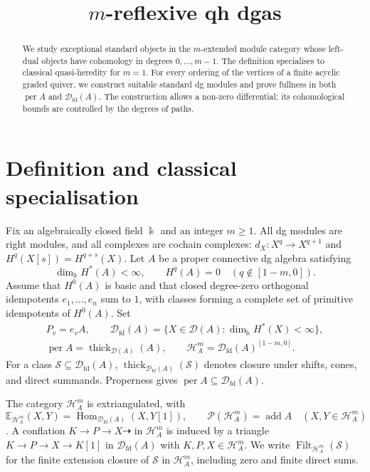 \documentclass[11pt,a4paper]{article}
\title{$m$-reflexive qh dgas}
\author{}
\date{}
\newcommand{\D}{\mathcal D}
\renewcommand{\H}{\mathcal H}
\DeclareMathOperator{\fd}{fd}
\DeclareMathOperator{\Hom}{Hom}
\DeclareMathOperator{\add}{add}
\DeclareMathOperator{\thick}{thick}
\DeclareMathOperator{\per}{per}
\DeclareMathOperator{\Filt}{Filt}
\theoremstyle{plain}
\theoremstyle{definition}
\numberwithin{equation}{section}
\begin{document}
\maketitle
\begin{abstract}
We study exceptional standard objects in the $m$-extended module category
whose left-dual objects have cohomology in degrees $0,\ldots,m-1$.
The definition specialises to classical quasi-heredity for $m=1$.
For every ordering of the vertices of a finite acyclic graded quiver,
we construct suitable standard dg modules and prove fullness in both
$\per A$ and $\D_{\fd}(A)$. The construction allows a non-zero differential;
its cohomological bounds are controlled by the degrees of paths.
\end{abstract}

\section{Definition and classical specialisation}\label{sec:definition}

Fix an algebraically closed field $\Bbbk$ and an integer $m\geq1$.
All dg modules are right modules, and all complexes are cochain complexes:
$d_X:X^q\to X^{q+1}$ and $H^q(X[s])=H^{q+s}(X)$.
Let $A$ be a proper connective dg algebra satisfying
\begin{equation}\label{eq:standing}
 \dim_{\Bbbk}H^*(A)<\infty,\qquad
 H^q(A)=0\quad(q\notin[1-m,0]).
\end{equation}
Assume that $H^0(A)$ is basic and that closed degree-zero orthogonal
idempotents $e_1,\ldots,e_n$ sum to $1$, with classes forming a complete
set of primitive idempotents of $H^0(A)$. Set
\begin{equation}\label{eq:categories}
 \begin{gathered}
 P_v=e_vA,\qquad
 \D_{\fd}(A)=\{X\in\D(A):\dim_{\Bbbk}H^*(X)<\infty\},\\
 \per A=\thick_{\D(A)}(A),\qquad
 \H_A^m=\D_{\fd}(A)^{[1-m,0]}.
 \end{gathered}
\end{equation}
For a class $\mathcal S\subseteq\D_{\fd}(A)$,
$\thick_{\D_{\fd}(A)}(\mathcal S)$ denotes closure under shifts, cones,
and direct summands. Properness gives $\per A\subseteq\D_{\fd}(A)$.

The category $\H_A^m$ is extriangulated, with
\begin{equation}\label{eq:extension}
 \mathbb E_{\H_A^m}(X,Y)=\Hom_{\D_{\fd}(A)}(X,Y[1]),
 \qquad \mathcal P(\H_A^m)=\add A
 \quad(X,Y\in\H_A^m)
\end{equation}
\cite[Corollary 2.3]{MP25}. A conflation
$K\to P\to X\dashrightarrow$ in $\H_A^m$ is induced by a triangle
$K\to P\to X\to K[1]$ in $\D_{\fd}(A)$ with $K,P,X\in\H_A^m$.
We write $\Filt_{\H_A^m}(\mathcal S)$ for the finite extension closure
of $\mathcal S$ in $\H_A^m$, including zero and finite direct sums.
\end{document}
